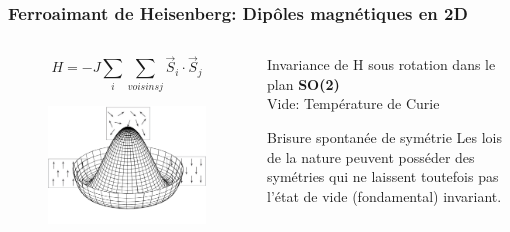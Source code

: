 \documentclass[handout]{beamer}
\begin{document}
\begin{frame}\frametitle{Ferroaimant de Heisenberg: Dipôles magnétiques en 2D}

\begin{columns}[T]
 \begin{column}[T]{.5\linewidth}
 \begin{equation*}
H= -J\sum_{i}{\sum_{voisins j}{\vec{S}_i\cdot\vec{S}_j}}
\end{equation*} 

\begin{figure}[0.5\textwidth]
   \includegraphics[scale=0.25]{potpot.png}
 \end{figure}
 \end{column}
 \begin{column}{.5\linewidth}

 Invariance de H sous rotation dans le plan \textbf{SO(2)} \\[0.25 cm]
 Vide: Température de Curie
 
  \begin{block}{Brisure spontanée de symétrie}
Les lois de la nature peuvent posséder des symétries qui ne laissent toutefois pas l'état de vide (fondamental) invariant.
\end{block}
  \end{column}
\end{columns}
\end{frame}
%
%    
\end{document}
